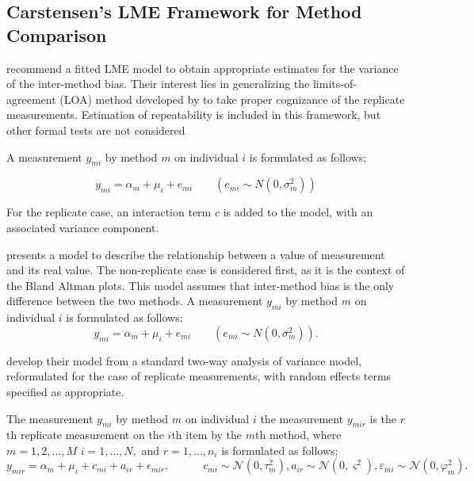 \documentclass[12pt, a4paper]{report}
\theoremstyle{plain}
\theoremstyle{definition}
\theoremstyle{remark}
\begin{document}
	
	
	
	\subsection{Carstensen's LME Framework for Method Comparison}
	
	
	
	\citet{BXC2008} recommend a fitted LME model to obtain appropriate estimates for the variance of the inter-method bias. Their interest lies in generalizing the limits-of-agreement (LOA) method developed by \citet{BA86} to take proper cognizance of the replicate measurements.  Estimation of repeatability is included in this framework, but other formal tests are not considered
	
	A measurement $y_{mi}$ by method $m$ on individual $i$ is
	formulated as follows;
	
	\begin{equation}
	y_{mi}  = \alpha_{m} + \mu_{i} + e_{mi} \qquad ( e_{mi} \sim
	N(0,\sigma^{2}_{m}))
	\end{equation}
	
	
	
	
	For the
	replicate case, an interaction term $c$ is added to the model,
	with an associated variance component. 
	
	\citet{BXC2004} presents a model to describe the relationship between a value of measurement and its real value. The non-replicate case is considered first, as it is the context of the Bland Altman plots. This model assumes that inter-method bias is the only difference between the two methods. A measurement $y_{mi}$ by method $m$ on individual $i$ is formulated as follows:
	\begin{equation}
	y_{mi}  = \alpha_{m} + \mu_{i} + e_{mi} \qquad ( e_{mi} \sim
	N(0,\sigma^{2}_{m})).
	\end{equation}
	
	\citet{BXC2008} develop their model from a standard two-way analysis of variance model, reformulated for the case of replicate measurements, with random effects terms specified as appropriate. 
	
	
	
	The measurement $y_{mi}$ by method $m$ on individual $i$ the measurement $y_{mir} $ is the $r$th replicate measurement on the $i$th item by the $m$th method, where $m=1,2,\ldots,M$ $i=1,\ldots,N,$ and $r = 1,\ldots,n_i$ is formulated as follows;
	\begin{equation}
	y_{mir}  = \alpha_{m} + \mu_{i} + c_{mi} + a_{ir} + \epsilon_{mir}, \qquad \quad c_{mi} \sim \mathcal{N}(0,\tau^{2}_{m}) , a_{ir} \sim \mathcal{N}(0,\varsigma^{2}),  \varepsilon_{mi} \sim \mathcal{N}(0,\varphi^{2}_{m}) .
	\end{equation}
	
\end{document}
